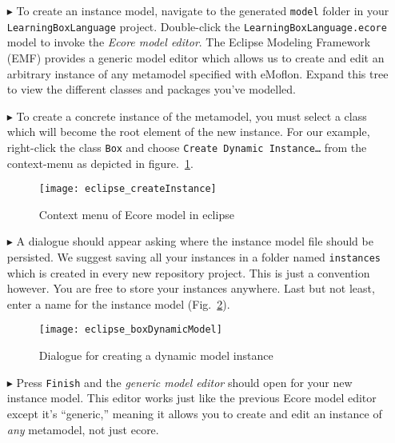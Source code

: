 \begin{itemize}

\item[$\blacktriangleright$] To create an instance model, navigate to the generated \texttt{model} folder in your \texttt{LearningBoxLanguage} project. Double-click the \texttt{LearningBoxLanguage.ecore} model to invoke  the \emph{Ecore model editor}. The Eclipse Modeling Framework (EMF) provides a generic model editor which allows us to create and edit an arbitrary instance of any metamodel specified with eMoflon. Expand this tree to view the different classes and packages you've modelled. 

\item[$\blacktriangleright$] To create a concrete instance of the metamodel, you must select a class which will become the root element of the new instance.
For our example, right-click the class \texttt{Box} and choose \texttt{Create Dynamic Instance\ldots} from the context-menu as depicted in figure.~\ref{fig:context_menu}.

\begin{figure}[htbp]
	\centering
  \texttt{[image: eclipse\_createInstance]}
	\caption{Context menu of Ecore model in eclipse}
	\label{fig:context_menu}
\end{figure}


\item[$\blacktriangleright$] A dialogue should appear asking where the instance model file should be persisted. We suggest saving all your instances in a folder named \texttt{instances} which is created in every new repository project. This is just a convention however. You are free to store your instances anywhere. Last but not least, enter a name for the instance model (Fig.~\ref{fig:store_dynamic_instance}).

\begin{figure}[htbp]
	\centering
  \texttt{[image: eclipse\_boxDynamicModel]}
	\caption{Dialogue for creating a dynamic model instance}
	\label{fig:store_dynamic_instance}
\end{figure}

\item[$\blacktriangleright$] Press \texttt{Finish} and the \emph{generic model editor} should open for your new instance model.
This editor works just like the previous Ecore model editor except it's ``generic,'' meaning it allows you to create and edit an instance of \emph{any} metamodel, not just ecore.


\end{itemize}
